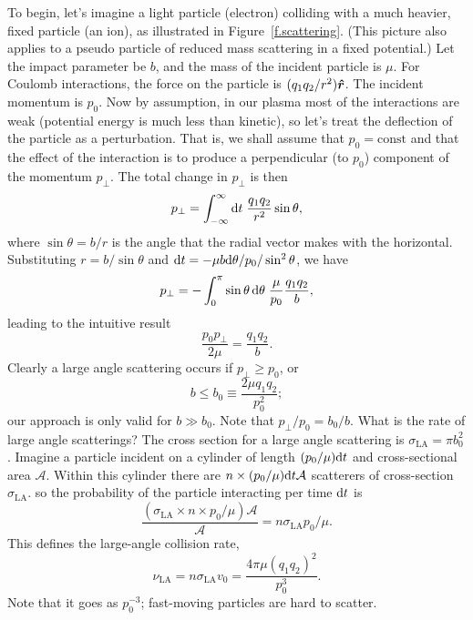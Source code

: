 To begin, let's imagine a light particle (electron) colliding with a much heavier, fixed particle (an ion), as illustrated in Figure~\ref{f.scattering}.  (This picture also applies to a pseudo particle of reduced mass scattering in a fixed potential.)  Let the impact parameter be $b$, and the mass of the incident particle is $\mu$.  For Coulomb interactions, the force on the particle is $(q_{1}q_{2}/r^{2})\boldsymbol{\hat{r}}$. The incident momentum is $p_{0}$. Now by assumption, in our plasma most of the interactions are weak (potential energy is much less than kinetic), so let's treat the deflection of the particle as a perturbation.  That is, we shall assume that $p_{0} = \textrm{const}$ and that the effect of the interaction is to produce a perpendicular (to $p_{0}$) component of the momentum $p_{\bot}$.  The total change in $p_{\bot}$ is then
\[ p_{\bot} = \int_{-\infty}^{\infty}\mathrm{d} t\; \frac{q_{1}q_{2}}{r^{2}}\sin\theta, \]
where $\sin\theta = b/r$ is the angle that the radial vector makes with the horizontal.  Substituting $r = b/\sin\theta$ and $\mathrm{d} t = -\mu b \mathrm{d} \theta/p_{0}/\sin^{2}\theta$, we have
\[ p_{\bot} = -\int_{0}^{\pi} \sin\theta\,\mathrm{d}\theta\; \frac{\mu}{p_{0}}\frac{q_{1}q_{2}}{b}, \]
leading to the intuitive result
\begin{equation}\label{e.pperp}
\frac{p_{0}p_{\bot}}{2\mu} = \frac{q_{1}q_{2}}{b}.
\end{equation}
Clearly a large angle scattering occurs if $p_{\bot}\ge p_{0}$, or
\begin{equation}\label{e.b0}
b \le b_{0} \equiv \frac{2\mu q_{1}q_{2}}{p_{0}^{2}};
\end{equation}
our approach is only valid for $b \gg b_{0}$.  Note that $p_{\bot}/p_{0} = b_{0}/b$. What is the rate of large angle  scatterings? The cross section for a large angle scattering is
$ \sigma_{\mathrm{LA}} = \pi b_{0}^{2}$.  Imagine a particle incident on a cylinder of length $(p_{0}/\mu)\mathrm{d} t$ and cross-sectional area $\mathcal{A}$.  Within this cylinder there are $n\times (p_{0}/\mu)\mathrm{d} t \mathcal{A}$ scatterers of cross-section $\sigma_{\mathrm{LA}}$. so the probability of the particle interacting per time $\mathrm{d} t$ is
\[ \frac{(\sigma_{\mathrm{LA}}\times n\times p_{0}/\mu) \mathcal{A}}{\mathcal{A}}  = n\sigma_{\mathrm{LA}} p_{0}/\mu. \]
This defines the large-angle collision rate,
\begin{equation}\label{e.large-angle-collision-rate}
\nu_{\mathrm{LA}} = n\sigma_{\mathrm{LA}} v_{0} = \frac{4\pi \mu (q_{1}q_{2})^{2}}{p_{0}^{3}}.
\end{equation}
Note that it goes as $p_{0}^{-3}$; fast-moving particles are hard to scatter.

